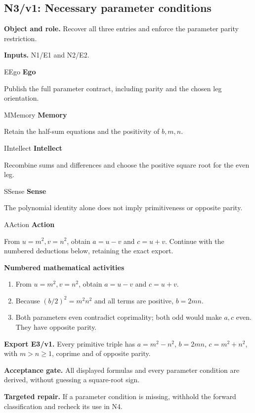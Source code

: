 \documentclass[preprint,12pt,aps,pra,showkeys,amsmath,amssymb,superscriptaddress,floatfix]{revtex4-2}
\theoremstyle{definition}
\theoremstyle{remark}
\newcommand{\mmfaculty}[3]{%
 \begin{mmfacultybox}{#1}{#2}
 {\sffamily\bfseries\color{MMBlue}#2}\par\smallskip #3
 \end{mmfacultybox}}
\newcommand{\field}[2]{\par\smallskip\noindent\textbf{#1.} #2\par}
\begin{document}
\clearpage

\subsection{N3/v1: Necessary parameter conditions}

\field{Object and role}{Recover all three entries and enforce the parameter parity restriction.}

\field{Inputs}{N1/E1 and N2/E2.}

\mmfaculty{E}{Ego}{Publish the full parameter contract, including parity and the chosen leg
orientation.}

\mmfaculty{M}{Memory}{Retain the half-sum equations and the positivity of \(b,m,n\).}

\mmfaculty{I}{Intellect}{Recombine sums and differences and choose the positive square root for
the even leg.}

\mmfaculty{S}{Sense}{The polynomial identity alone does not imply primitiveness or opposite
parity.}

\mmfaculty{A}{Action}{From \(u=m^2,v=n^2\), obtain \(a=u-v\) and \(c=u+v\). Continue with the
numbered deductions below, retaining the exact export.}

\smallskip\noindent\textbf{Numbered mathematical activities}

\begin{enumerate}[label=N3.\arabic*,leftmargin=3.4em]

\item From \(u=m^2,v=n^2\), obtain \(a=u-v\) and \(c=u+v\).

\item Because \((b/2)^2=m^2n^2\) and all terms are positive, \(b=2mn\).

\item Both parameters even contradict coprimality; both odd would make \(a,c\)
even. They have opposite parity.

\end{enumerate}

\field{Export E3/v1}{Every primitive triple has \(a=m^2-n^2\), \(b=2mn\), \(c=m^2+n^2\), with
\(m>n\ge1\), coprime and of opposite parity.}

\field{Acceptance gate}{All displayed formulas and every parameter condition are derived,
without guessing a square-root sign.}

\field{Targeted repair}{If a parameter condition is missing, withhold the forward classification
and recheck its use in N4.}
\end{document}
